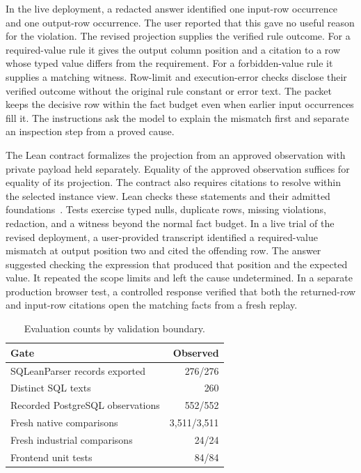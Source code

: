 \documentclass[sigconf,nonacm]{acmart}
\begin{document}
In the live deployment, a redacted answer identified one input-row occurrence and one output-row occurrence. The user reported that this gave no useful reason for the violation. The revised projection supplies the verified rule outcome. For a required-value rule it gives the output column position and a citation to a row whose typed value differs from the requirement. For a forbidden-value rule it supplies a matching witness. Row-limit and execution-error checks disclose their verified outcome without the original rule constant or error text. The packet keeps the decisive row within the fact budget even when earlier input occurrences fill it. The instructions ask the model to explain the mismatch first and separate an inspection step from a proved cause.

The Lean contract formalizes the projection from an approved observation with private payload held separately. Equality of the approved observation suffices for equality of its projection. The contract also requires citations to resolve within the selected instance view. Lean checks these statements and their admitted foundations~\cite{lean2021}. Tests exercise typed nulls, duplicate rows, missing violations, redaction, and a witness beyond the normal fact budget. In a live trial of the revised deployment, a user-provided transcript identified a required-value mismatch at output position two and cited the offending row. The answer suggested checking the expression that produced that position and the expected value. It repeated the scope limits and left the cause undetermined. In a separate production browser test, a controlled response verified that both the returned-row and input-row citations open the matching facts from a fresh replay.

\begin{table}[t]
  \caption{Evaluation counts by validation boundary.}
  \label{tab:checks}
  \centering
  \small
  \begin{tabular}{@{}lr@{}}
    \toprule
    Gate & Observed \\
    \midrule
    SQLeanParser records exported & 276/276 \\
    Distinct SQL texts & 260 \\
    Recorded PostgreSQL observations & 552/552 \\
    Fresh native comparisons & 3,511/3,511 \\
    Fresh industrial comparisons & 24/24 \\
    Frontend unit tests & 84/84 \\
    \bottomrule
  \end{tabular}
\end{table}
\end{document}
